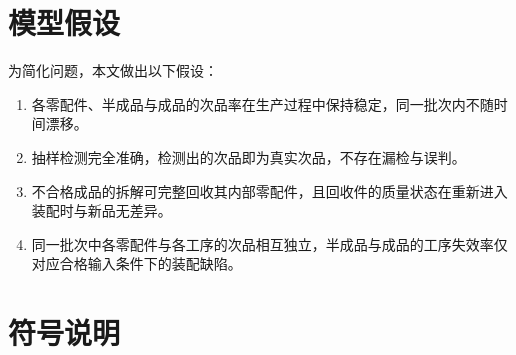 \documentclass[withoutpreface,bwprint]{cumcmthesis}
\numberwithin{equation}{section}
\begin{document}
\section{模型假设}

为简化问题，本文做出以下假设：

\begin{enumerate}[itemindent=2em]

    \item 各零配件、半成品与成品的次品率在生产过程中保持稳定，同一批次内不随时间漂移。

    \item 抽样检测完全准确，检测出的次品即为真实次品，不存在漏检与误判。

    \item 不合格成品的拆解可完整回收其内部零配件，且回收件的质量状态在重新进入装配时与新品无差异。

    \item 同一批次中各零配件与各工序的次品相互独立，半成品与成品的工序失效率仅对应合格输入条件下的装配缺陷。

\end{enumerate}


\section{符号说明}
\end{document}
